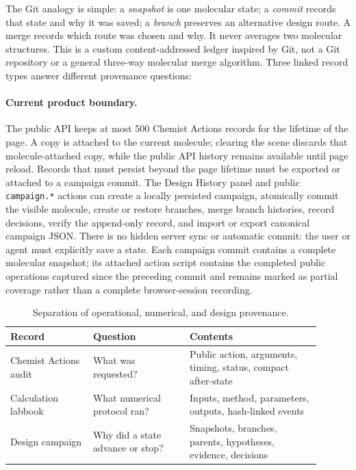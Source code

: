 The Git analogy is simple: a \emph{snapshot} is one molecular state; a
\emph{commit} records that state and why it was saved; a \emph{branch} preserves
an alternative design route. A merge records which route was chosen and why. It
never averages two molecular structures. This is a custom content-addressed
ledger inspired by Git, not a Git repository or a general three-way molecular
merge algorithm. Three linked record types answer different provenance
questions:

\paragraph{Current product boundary.}
The public API keeps at most 500 Chemist Actions records for the lifetime of the
page. A copy is attached to the current molecule; clearing the scene discards
that molecule-attached copy, while the public API history remains available
until page reload. Records that must persist beyond the page lifetime must be
exported or attached to a campaign commit. The Design History panel and
public \texttt{campaign.*} actions can create a locally persisted campaign,
atomically commit the visible molecule, create or restore branches, merge branch
histories, record decisions, verify the append-only record, and import or export
canonical campaign JSON. There is no hidden server sync or automatic commit:
the user or agent must explicitly save a state. Each campaign commit contains a
complete molecular snapshot; its attached action script contains the completed
public operations captured since the preceding commit and remains marked as
partial coverage rather than a complete browser-session recording.

\begin{table}[htbp]
  \centering
  \caption{Separation of operational, numerical, and design provenance.}
  \label{tab:design-records}
  \footnotesize
  \renewcommand{\arraystretch}{1.08}
  \begin{tabular}{@{}>{\raggedright\arraybackslash}p{0.24\linewidth}
                       >{\raggedright\arraybackslash}p{0.28\linewidth}
                       >{\raggedright\arraybackslash}p{0.38\linewidth}@{}}
    \toprule
    Record & Question & Contents \\
    \midrule
    Chemist Actions audit & What was requested? &
      Public action, arguments, timing, status, compact after-state \\
    Calculation labbook & What numerical protocol ran? &
      Inputs, method, parameters, outputs, hash-linked events \\
    Design campaign & Why did a state advance or stop? &
      Snapshots, branches, parents, hypotheses, evidence, decisions \\
    \bottomrule
  \end{tabular}
\end{table}


